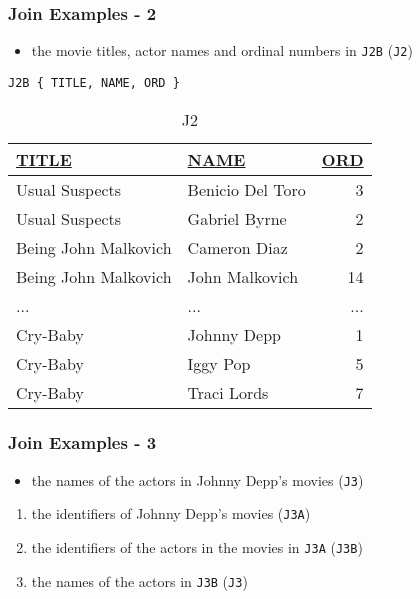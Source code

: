 \documentclass[dvipsnames]{beamer}
\theoremstyle{plain}
\begin{document}
\begin{frame}[fragile]
  \frametitle{Join Examples - 2}

  \begin{example}
    \begin{itemize}
      \item the movie titles, actor names and ordinal numbers in \texttt{J2B}
        (\texttt{J2})
    \end{itemize}

    \begin{lstlisting}
J2B { TITLE, NAME, ORD }
    \end{lstlisting}

    \pause
    \vspace{-10pt}
    \begin{tiny}
    \begin{table}
      \caption{J2}
      \begin{tabular}{|l|l|r|}\hline
\underline{TITLE}    & \underline{NAME} & \underline{ORD}\\[2pt]\hline\hline
Usual Suspects       & Benicio Del Toro &   3\\\hline
Usual Suspects       & Gabriel Byrne    &   2\\\hline
Being John Malkovich & Cameron Diaz     &   2\\\hline
Being John Malkovich & John Malkovich   &  14\\\hline
...                  & ...              & ...\\\hline
Cry-Baby             & Johnny Depp      &   1\\\hline
Cry-Baby             & Iggy Pop         &   5\\\hline
Cry-Baby             & Traci Lords      &   7\\\hline
      \end{tabular}
    \end{table}
    \end{tiny}
  \end{example}
\end{frame}

\begin{frame}
  \frametitle{Join Examples - 3}

  \begin{example}
    \begin{itemize}
      \item the names of the actors in Johnny Depp's movies (\texttt{J3})
    \end{itemize}

    \pause
    \begin{enumerate}
      \item the identifiers of Johnny Depp's movies (\texttt{J3A})

      \pause
      \item the identifiers of the actors in the movies in \texttt{J3A}
        (\texttt{J3B})

      \pause
      \item the names of the actors in \texttt{J3B} (\texttt{J3})
    \end{enumerate}
  \end{example}
\end{frame}
\end{document}
